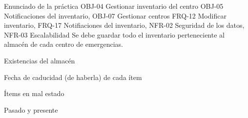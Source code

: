 {\reportauthors}
{Enunciado de la práctica}
{OBJ-04 Gestionar inventario del centro OBJ-05 Notificaciones del inventario, OBJ-07 Gestionar centros}
{FRQ-12 Modificar inventario, FRQ-17 Notifiaciones del inventario, NFR-02 Seguridad de los datos, NFR-03 Escalabilidad}
{Se debe guardar todo el inventario perteneciente al almacén de cada centro de emergencias.}
{
\item{Existencias del almacén}
\item{Fecha de caducidad (de haberla) de cada ítem}
\item{Ítems en mal estado}
}
{Pasado y presente}

